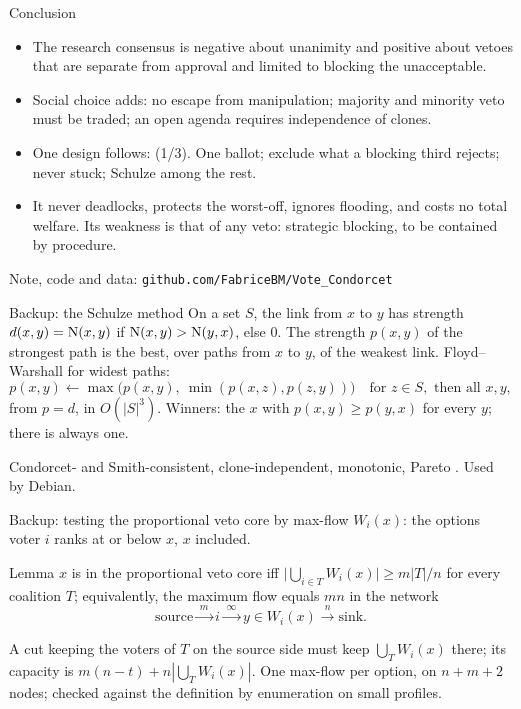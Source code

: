 \documentclass[10pt,aspectratio=169]{beamer}
\begin{document}
\begin{frame}{Conclusion}
  \begin{itemize}
    \item The research consensus is \alert{negative about unanimity} and positive about vetoes that are
      separate from approval and limited to blocking the unacceptable.
    \item Social choice adds: no escape from manipulation; majority and minority veto must be traded; an
      open agenda requires independence of clones.
    \item One design follows: \alert{\QVC(1/3)}. One ballot; exclude what a blocking third rejects; never
      stuck; Schulze among the rest.
    \item It never deadlocks, protects the worst-off, ignores flooding, and costs no total welfare. Its
      weakness is that of any veto: strategic blocking, to be contained by procedure.
  \end{itemize}
  \vfill
  \begin{center}
    \small Note, code and data: \texttt{github.com/FabriceBM/Vote\_Condorcet}
  \end{center}
\end{frame}

\appendix

\begin{frame}{Backup: the Schulze method}
  On a set $S$, the link from $x$ to $y$ has strength $d(x,y) = \operatorname{N}(x,y)$ if $\operatorname{N}(x,y) > \operatorname{N}(y,x)$, else
  $0$. The strength $p(x,y)$ of the strongest path is the best, over paths from $x$ to $y$, of the weakest
  link. Floyd--Warshall for widest paths:
  \[
    p(x,y) \gets \max\bigl(p(x,y),\ \min(p(x,z), p(z,y))\bigr) \quad \text{for } z \in S, \text{ then all } x, y,
  \]
  from $p = d$, in $O(|S|^3)$. Winners: the $x$ with $p(x,y) \ge p(y,x)$ for every $y$; there is always one.
  \medskip

  Condorcet- and Smith-consistent, clone-independent, monotonic, Pareto . Used by
  Debian.
\end{frame}

\begin{frame}{Backup: testing the proportional veto core by max-flow}
  $W_i(x)$: the options voter $i$ ranks at or below $x$, $x$ included.
  \begin{block}{Lemma}
    $x$ is in the proportional veto core iff $\bigl|\bigcup_{i \in T} W_i(x)\bigr| \ge m|T|/n$ for every
    coalition $T$; equivalently, the maximum flow equals $mn$ in the network
    \[
      \text{source} \xrightarrow{\;m\;} i \xrightarrow{\;\infty\;} y \in W_i(x) \xrightarrow{\;n\;}
      \text{sink}.
    \]
  \end{block}
  A cut keeping the voters of $T$ on the source side must keep $\bigcup_T W_i(x)$ there; its capacity is
  $m(n-t) + n|\bigcup_T W_i(x)|$. One max-flow per option, on $n + m + 2$ nodes; checked against the
  definition by enumeration on small profiles. 
\end{frame}
\end{document}
